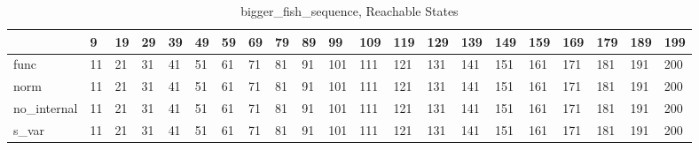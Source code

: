 \begin{table}
\centering
\caption{bigger_fish_sequence, Reachable States}
\label{bigger_fish_sequence_reach}
\begin{tabular}{lllllllllllllllllllll}
\toprule
{} &   9 &  19 &  29 &  39 &  49 &  59 &  69 &  79 &  89 &   99 &  109 &  119 &  129 &  139 &  149 &  159 &  169 &  179 &  189 &  199 \\
\midrule
func        &  11 &  21 &  31 &  41 &  51 &  61 &  71 &  81 &  91 &  101 &  111 &  121 &  131 &  141 &  151 &  161 &  171 &  181 &  191 &  200 \\
norm        &  11 &  21 &  31 &  41 &  51 &  61 &  71 &  81 &  91 &  101 &  111 &  121 &  131 &  141 &  151 &  161 &  171 &  181 &  191 &  200 \\
no\_internal &  11 &  21 &  31 &  41 &  51 &  61 &  71 &  81 &  91 &  101 &  111 &  121 &  131 &  141 &  151 &  161 &  171 &  181 &  191 &  200 \\
s\_var       &  11 &  21 &  31 &  41 &  51 &  61 &  71 &  81 &  91 &  101 &  111 &  121 &  131 &  141 &  151 &  161 &  171 &  181 &  191 &  200 \\
\bottomrule
\end{tabular}
\end{table}
